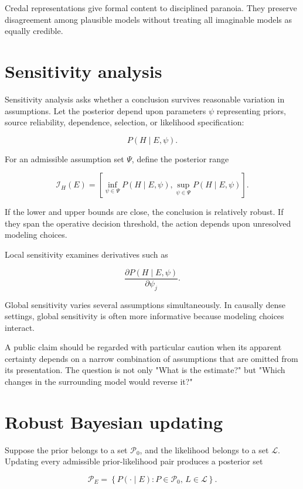 Credal representations give formal content to disciplined paranoia. They preserve disagreement among plausible models without treating all imaginable models as equally credible.

\section{Sensitivity analysis}
\label{sec:a23}

Sensitivity analysis asks whether a conclusion survives reasonable variation in assumptions. Let the posterior depend upon parameters \(\psi\) representing priors, source reliability, dependence, selection, or likelihood specification:

\[
P(H\mid E,\psi).
\]

For an admissible assumption set \(\Psi\), define the posterior range

\[
\mathcal I_H(E)
=
\left[
\inf_{\psi\in\Psi}P(H\mid E,\psi),
\sup_{\psi\in\Psi}P(H\mid E,\psi)
\right].
\]

If the lower and upper bounds are close, the conclusion is relatively robust. If they span the operative decision threshold, the action depends upon unresolved modeling choices.

Local sensitivity examines derivatives such as

\[
\frac{\partial P(H\mid E,\psi)}
{\partial\psi_j}.
\]

Global sensitivity varies several assumptions simultaneously. In causally dense settings, global sensitivity is often more informative because modeling choices interact.

A public claim should be regarded with particular caution when its apparent certainty depends on a narrow combination of assumptions that are omitted from its presentation. The question is not only "What is the estimate?" but "Which changes in the surrounding model would reverse it?"

\section{Robust Bayesian updating}
\label{sec:a24}

Suppose the prior belongs to a set \(\mathcal P_0\), and the likelihood belongs to a set \(\mathcal L\). Updating every admissible prior-likelihood pair produces a posterior set

\[
\mathcal P_E
=
\left\{
P(\cdot\mid E):
P\in\mathcal P_0,\,
L\in\mathcal L
\right\}.
\]

